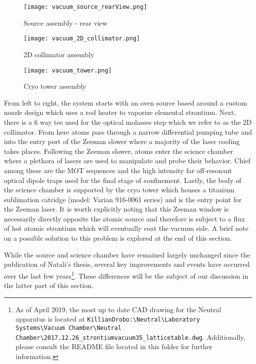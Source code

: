	\begin{figure} 
		\centerline{
		\texttt{[image: vacuum\_source\_rearView.png]}}
		\caption{Source assembly - rear view}
		\label{fig:sourceRearView}
	\end{figure}
	
	\begin{figure} 
		\centerline{
		\texttt{[image: vacuum\_2D\_collimator.png]}}
		\caption{2D collimator assembly}
		\label{fig:assembly_2Dcoll}
	\end{figure}
	
	\begin{figure} 
		\centerline{
		\texttt{[image: vacuum\_tower.png]}}
		\caption{Cryo tower assembly}
		\label{fig:cryoTower}
	\end{figure}
From left to right, the system starts with an oven source based around a custom nozzle design which uses a rod heater to vaporize elemental strontium.
Next, there is a 6 way tee used for the optical molasses step which we refer to as the 2D collimator. 
From here atoms pass through a narrow differential pumping tube and into the entry port of the Zeeman slower where a majority of the laser cooling takes places. 
Following the Zeeman slower, atoms enter the science chamber where a plethora of lasers are used to manipulate and probe their behavior.
Chief among these are the MOT sequences and the high intensity far off-resonant optical dipole traps used for the final stage of confinement.
Lastly, the body of the science chamber is supported by the cryo tower which houses a titanium sublimation catridge (model: Varian 916-0061 series) and is the entry point for the Zeeman laser.
It is worth explicitly noting that this Zeeman window is necessarily directly opposite the atomic source and therefore is subject to a flux of hot atomic strontium which will eventually coat the vacuum side. A brief note on a possible solution to this problem is explored at the end of this section.

While the source and science chamber have remained largely unchanged since the publication of Natali's thesis, several key improvements and events have occurred over the last few years\footnote{As of April 2019, the most up to date CAD drawing for the Neutral apparatus is located at \texttt{KillianDrobo:\textbackslash Neutral\textbackslash Laboratory Systems\textbackslash Vacuum Chamber\textbackslash Neutral Chamber\textbackslash 2017.12.26\_strontiumvacuum35\_latticetable.dwg}. Additionally, please consult the README file located in this folder for further information.}.
These differences will be the subject of our discussion in the latter part of this section.


